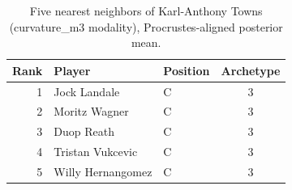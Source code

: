 \begin{table}[htbp]
  \centering\small
  \begin{tabular}{rllc}
    \toprule
    Rank & Player & Position & Archetype \\
    \midrule
    1 & Jock Landale & C & 3 \\
    2 & Moritz Wagner & C & 3 \\
    3 & Duop Reath & C & 3 \\
    4 & Tristan Vukcevic & C & 3 \\
    5 & Willy Hernangomez & C & 3 \\
    \bottomrule
  \end{tabular}
  \caption{Five nearest neighbors of Karl-Anthony Towns (curvature_m3 modality), Procrustes-aligned posterior mean.}
  \label{tab:Karl_Anthony_Towns_neighbors_curvature_m3}
\end{table}

